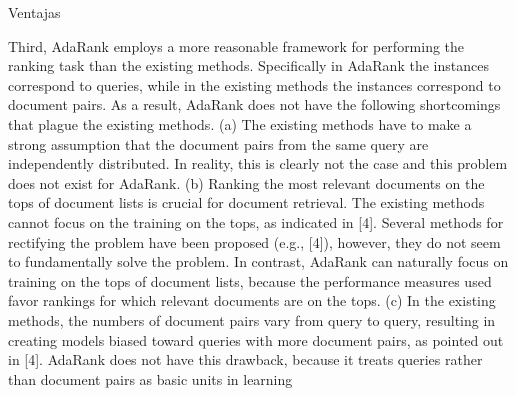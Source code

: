 \documentclass{beamer}
\begin{document}
\begin{frame}{Ventajas}
\begin{note}
{        Third, AdaRank employs a more reasonable framework for performing the ranking task than the existing methods. Specifically in AdaRank the instances correspond to queries, while in the existing methods the instances correspond to document pairs. As a result, AdaRank does not have the following shortcomings that plague the existing methods. (a) The existing methods have to make a strong assumption that the document pairs from the same query are independently distributed. In reality, this is clearly not the case and this problem does not exist for AdaRank. (b) Ranking the most relevant documents on the tops of document lists is crucial for document retrieval. The existing methods cannot focus on the training on the tops, as indicated in [4]. Several methods for rectifying the problem have been proposed (e.g., [4]), however, they do not seem to fundamentally solve the problem. In contrast, AdaRank can naturally focus on training on the tops of document lists, because the performance measures used favor rankings for which relevant documents are on the tops. (c) In the existing methods, the numbers of document pairs vary from query to query, resulting in creating models biased toward queries with more document pairs, as pointed out in [4]. AdaRank does not have this drawback, because it treats queries rather than document pairs as basic units in learning}
    \end{note}
\end{frame}
\end{document}
